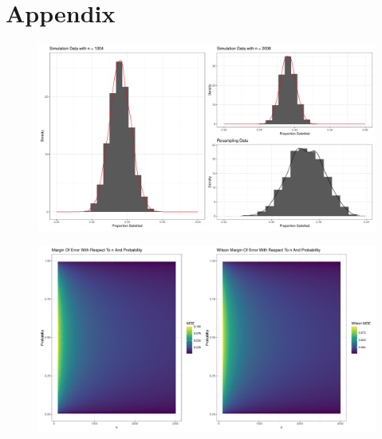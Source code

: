 \documentclass{article}\usepackage[]{graphicx}\usepackage[]{xcolor}
\begin{document}
\newpage
\onecolumn
\section{Appendix}

\begin{figure}[H]
  \begin{center}
    \includegraphics[scale=0.35]{graphs.pdf}
    \caption{}
    \label{moe}
  \end{center}
\end{figure}

\begin{figure}[H]
  \begin{center}
    \includegraphics[scale=0.35]{raster.pdf}
    \caption{}
    \label{moe}
  \end{center}
\end{figure}
\end{document}
